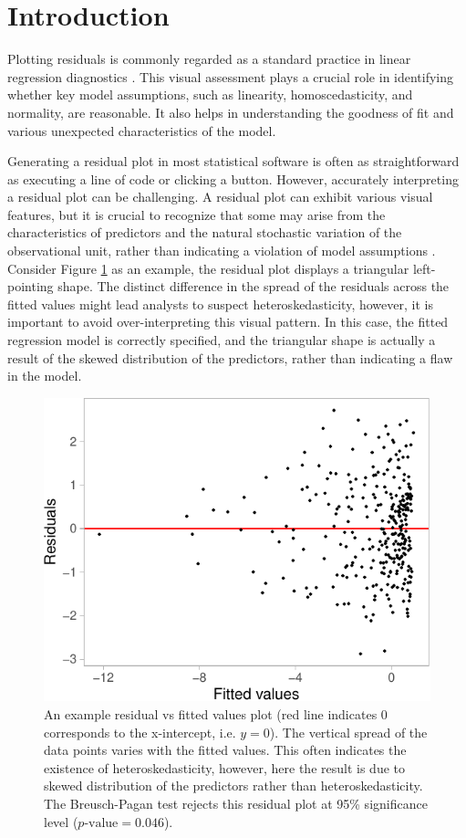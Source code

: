 \documentclass[]{interact}
\theoremstyle{plain}%
\theoremstyle{definition}
\theoremstyle{remark}
\begin{document}
\section{Introduction}\label{sec-model-introduction}

Plotting residuals is commonly regarded as a standard practice in linear
regression diagnostics \citep{belsley1980regression, cook1982residuals}.
This visual assessment plays a crucial role in identifying whether key
model assumptions, such as linearity, homoscedasticity, and normality,
are reasonable. It also helps in understanding the goodness of fit and
various unexpected characteristics of the model.

Generating a residual plot in most statistical software is often as
straightforward as executing a line of code or clicking a button.
However, accurately interpreting a residual plot can be challenging. A
residual plot can exhibit various visual features, but it is crucial to
recognize that some may arise from the characteristics of predictors and
the natural stochastic variation of the observational unit, rather than
indicating a violation of model assumptions \citep{li2024plot}. Consider
Figure \ref{fig:false-finding} as an example, the residual plot displays
a triangular left-pointing shape. The distinct difference in the spread
of the residuals across the fitted values might lead analysts to suspect
heteroskedasticity, however, it is important to avoid over-interpreting
this visual pattern. In this case, the fitted regression model is
correctly specified, and the triangular shape is actually a result of
the skewed distribution of the predictors, rather than indicating a flaw
in the model.

\begin{figure}[!h]

{\centering \includegraphics[width=0.5\linewidth]{paper_files/figure-latex/false-finding-1} 

}

\caption{An example residual vs fitted values plot (red line indicates 0 corresponds to the x-intercept, i.e. $y=0$). The vertical spread of the data points varies with the fitted values. This often indicates the existence of heteroskedasticity, however, here the result is due to skewed distribution of the predictors rather than heteroskedasticity. The Breusch-Pagan test rejects this residual plot at 95\% significance level ($p\text{-value} = 0.046$).}\label{fig:false-finding}
\end{figure}
\end{document}
